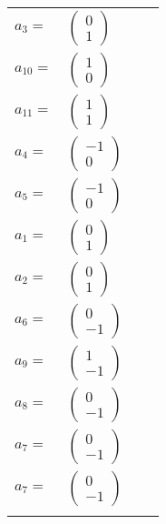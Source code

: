 \documentclass[1p]{elsarticle_modified}
\theoremstyle{definition}
\begin{document}
\begin{tabular}{m{7pt} m{180pt} m{7pt} m{180pt} }
\flushright $a_{3}=$&$\begin{pmatrix}0\\1\end{pmatrix}$ \\
\flushright $a_{10}=$&$\begin{pmatrix}1\\0\end{pmatrix}$ \\
\flushright $a_{11}=$&$\begin{pmatrix}1\\1\end{pmatrix}$ \\
\flushright $a_{4}=$&$\begin{pmatrix}-1\\0\end{pmatrix}$ \\
\flushright $a_{5}=$&$\begin{pmatrix}-1\\0\end{pmatrix}$ \\
\flushright $a_{1}=$&$\begin{pmatrix}0\\1\end{pmatrix}$ \\
\flushright $a_{2}=$&$\begin{pmatrix}0\\1\end{pmatrix}$ \\
\flushright $a_{6}=$&$\begin{pmatrix}0\\-1\end{pmatrix}$ \\
\flushright $a_{9}=$&$\begin{pmatrix}1\\-1\end{pmatrix}$ \\
\flushright $a_{8}=$&$\begin{pmatrix}0\\-1\end{pmatrix}$ \\
\flushright $a_{7}=$&$\begin{pmatrix}0\\-1\end{pmatrix}$\\ \flushright $a_{7}=$&$\begin{pmatrix}0\\-1\end{pmatrix}$\\&\end{tabular}
\end{document}
